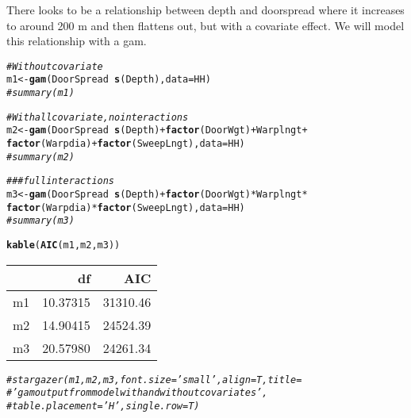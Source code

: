 \documentclass[12pt]{article}\usepackage[]{graphicx}\usepackage[]{color}
\makeatletter
\newcommand{\hlcom}[1]{\textcolor[rgb]{0.678,0.584,0.686}{\textit{#1}}}%
\newcommand{\hlopt}[1]{\textcolor[rgb]{0,0,0}{#1}}%
\newcommand{\hlstd}[1]{\textcolor[rgb]{0.345,0.345,0.345}{#1}}%
\newcommand{\hlkwb}[1]{\textcolor[rgb]{0.69,0.353,0.396}{#1}}%
\newcommand{\hlkwc}[1]{\textcolor[rgb]{0.333,0.667,0.333}{#1}}%
\newcommand{\hlkwd}[1]{\textcolor[rgb]{0.737,0.353,0.396}{\textbf{#1}}}%
\newenvironment{kframe}{%
 \def\at@end@of@kframe{}%
 \ifinner\ifhmode%
  \def\at@end@of@kframe{\end{minipage}}%
  \begin{minipage}{\columnwidth}%
 \fi\fi%
 \def\FrameCommand##1{\hskip\@totalleftmargin \hskip-\fboxsep
 \colorbox{shadecolor}{##1}\hskip-\fboxsep
     \hskip-\linewidth \hskip-\@totalleftmargin \hskip\columnwidth}%
 \MakeFramed {\advance\hsize-\width
   \@totalleftmargin\z@ \linewidth\hsize
   \@setminipage}}%
 {\par\unskip\endMakeFramed%
 \at@end@of@kframe}
\makeatother
\begin{document}
There looks to be a relationship between depth and doorspread where it
increases to around 200 m and then flattens out, but with a covariate effect.
We will model this relationship with a gam. 

\begin{kframe}
\begin{alltt}
\hlcom{# Without covariate}
\hlstd{m1} \hlkwb{<-} \hlkwd{gam}\hlstd{(DoorSpread} \hlopt{~} \hlkwd{s}\hlstd{(Depth),} \hlkwc{data} \hlstd{= HH)}
\hlcom{# summary(m1)}

\hlcom{# With all covariate, no interactions}
\hlstd{m2} \hlkwb{<-} \hlkwd{gam}\hlstd{(DoorSpread} \hlopt{~} \hlkwd{s}\hlstd{(Depth)} \hlopt{+} \hlkwd{factor}\hlstd{(DoorWgt)} \hlopt{+} \hlstd{Warplngt} \hlopt{+}
    \hlkwd{factor}\hlstd{(Warpdia)} \hlopt{+} \hlkwd{factor}\hlstd{(SweepLngt),} \hlkwc{data} \hlstd{= HH)}
\hlcom{# summary(m2)}

\hlcom{### full interactions}
\hlstd{m3} \hlkwb{<-} \hlkwd{gam}\hlstd{(DoorSpread} \hlopt{~} \hlkwd{s}\hlstd{(Depth)} \hlopt{+} \hlkwd{factor}\hlstd{(DoorWgt)} \hlopt{*} \hlstd{Warplngt} \hlopt{*}
    \hlkwd{factor}\hlstd{(Warpdia)} \hlopt{*} \hlkwd{factor}\hlstd{(SweepLngt),} \hlkwc{data} \hlstd{= HH)}
\hlcom{# summary(m3)}
\end{alltt}
\end{kframe}

\begin{kframe}
\begin{alltt}
\hlkwd{kable}\hlstd{(}\hlkwd{AIC}\hlstd{(m1, m2, m3))}
\end{alltt}
\end{kframe}
\begin{tabular}{l|r|r}
\hline
  & df & AIC\\
\hline
m1 & 10.37315 & 31310.46\\
\hline
m2 & 14.90415 & 24524.39\\
\hline
m3 & 20.57980 & 24261.34\\
\hline
\end{tabular}

\begin{kframe}\begin{alltt}
\hlcom{# stargazer(m1,m2,m3, font.size = 'small', align = T, title =}
\hlcom{# 'gam output from model with and without covariates',}
\hlcom{# table.placement = 'H', single.row = T)}
\end{alltt}
\end{kframe}
\end{document}
